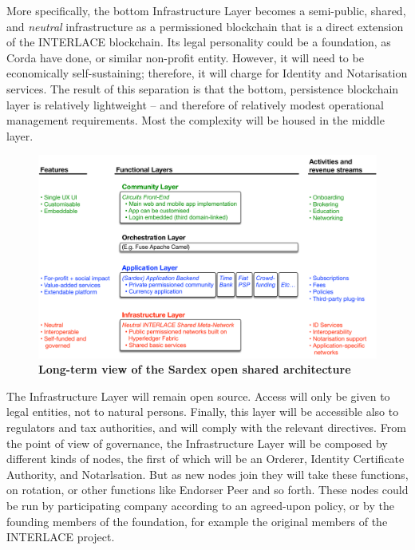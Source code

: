 More specifically, the bottom Infrastructure Layer becomes a semi-public, shared, and \emph{neutral} infrastructure as a permissioned blockchain that is a direct extension of the INTERLACE blockchain. Its legal personality could be a foundation, as Corda have done, or similar non-profit entity. However, it will need to be economically self-sustaining; therefore, it will charge for Identity and Notarisation services. The result of this separation is that the bottom, persistence blockchain layer is relatively lightweight -- and therefore of relatively modest operational management requirements. Most the complexity will be housed in the middle layer.

\begin{figure}[h]
\centering
\includegraphics[width=17 cm]{Figures/Open_Shared_Architecture}
\caption{\bf \small Long-term view of the Sardex open shared architecture}
\label{fig:OpenArchitecture}
\end{figure}

The Infrastructure Layer will remain open source. Access will only be given to legal entities, not to natural persons. Finally, this layer will be accessible also to regulators and tax authorities, and will comply with the relevant directives. From the point of view of governance, the Infrastructure Layer will be composed by different kinds of nodes, the first of which will be an Orderer, Identity Certificate Authority, and Notarlsation. But as new nodes join they will take these functions, on rotation, or other functions like Endorser Peer and so forth. These nodes could be run by participating company according to an agreed-upon policy, or by the founding members of the foundation, for example the original members of the INTERLACE project.

